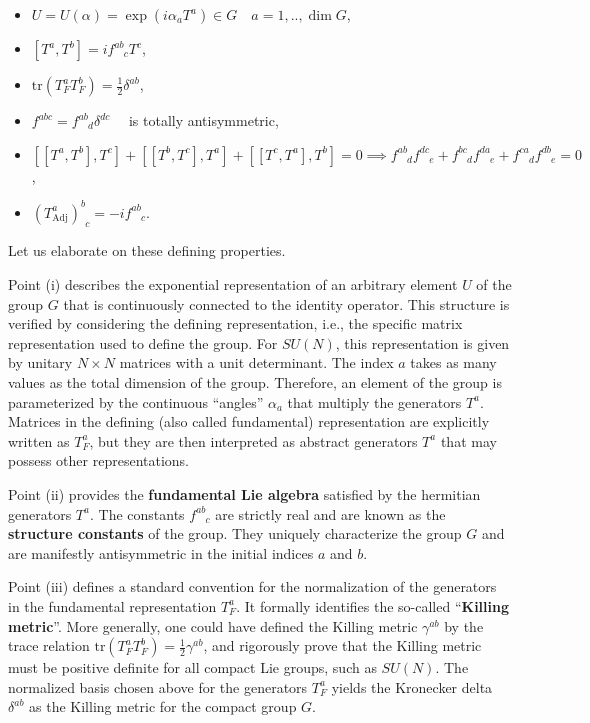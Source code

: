 \begin{itemize}
    \item[(i)] \(U = U(\alpha) = \exp(i\alpha_a T^a) \in G \quad a = 1, .., \dim G\),
    \item[(ii)] \([T^a, T^b] = i f^{ab}_{\phantom{ab}c} T^c\),
    \item[(iii)] \(\mathrm{tr}(T_F^a T_F^b) = \frac{1}{2}\delta^{ab}\),
    \item[(iv)] \(f^{abc} = f^{ab}_{\phantom{ab}d} \delta^{dc} \quad\) is totally antisymmetric,
    \item[(v)] \([[T^a, T^b], T^c] + [[T^b, T^c], T^a] + [[T^c, T^a], T^b] = 0  \implies f^{ab}_{\phantom{ab}d} f^{dc}_{\phantom{dc}e} + f^{bc}_{\phantom{bc}d} f^{da}_{\phantom{da}e} + f^{ca}_{\phantom{ca}d} f^{db}_{\phantom{db}e} = 0\),
    \item[(vi)] \((T_{\mathrm{Adj}}^a)^b_{\phantom{b}c} = -if^{ab}_{\phantom{ab}c}\).
\end{itemize}

Let us elaborate on these defining properties.

Point (i) describes the exponential representation of an arbitrary element \(U\) of the group \(G\) that is continuously connected to the identity operator. This structure is verified by considering the defining representation, i.e., the specific matrix representation used to define the group. For \(SU(N)\), this representation is given by unitary \(N \times N\) matrices with a unit determinant. The index \(a\) takes as many values as the total dimension of the group. Therefore, an element of the group is parameterized by the continuous ``angles'' \(\alpha_a\) that multiply the generators \(T^a\). Matrices in the defining (also called fundamental) representation are explicitly written as \(T_F^a\), but they are then interpreted as abstract generators \(T^a\) that may possess other representations.

Point (ii) provides the \textbf{fundamental Lie algebra} satisfied by the hermitian generators \(T^a\). The constants \(f^{ab}_{\phantom{ab}c}\) are strictly real and are known as the \textbf{structure constants} of the group. They uniquely characterize the group \(G\) and are manifestly antisymmetric in the initial indices \(a\) and \(b\).

Point (iii) defines a standard convention for the normalization of the generators in the fundamental representation \(T_F^a\). It formally identifies the so-called ``\textbf{Killing metric}''. More generally, one could have defined the Killing metric \(\gamma^{ab}\) by the trace relation \(\mathrm{tr}(T_F^a T_F^b) = \frac{1}{2}\gamma^{ab}\), and rigorously prove that the Killing metric must be positive definite for all compact Lie groups, such as \(SU(N)\). The normalized basis chosen above for the generators \(T_F^a\) yields the Kronecker delta \(\delta^{ab}\) as the Killing metric for the compact group \(G\).

